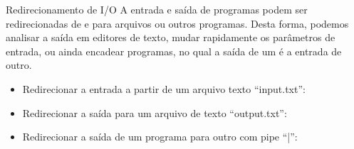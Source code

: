 \documentclass{beamer}
\begin{document}

\begin{frame}{Redirecionamento de I/O}
  A entrada e saída de programas podem ser redirecionadas de e para arquivos ou
  outros programas. Desta forma, podemos analisar a saída em editores de texto,
  mudar rapidamente os parâmetros de entrada, ou ainda encadear programas, no
  qual a saída de um é a entrada de outro.
  \begin{center}
    \begin{itemize}
    \item Redirecionar a entrada a partir de um arquivo texto ``input.txt'':
    \end{itemize}
    \begin{shell}
    \end{shell}

    \begin{itemize}
    \item Redirecionar a saída para um arquivo de texto ``output.txt'':
    \end{itemize}
    \begin{shell}
    \end{shell}

    \begin{itemize}
    \item Redirecionar a saída de um programa para outro com pipe ``|'':
    \end{itemize}
    \begin{shell}
    \end{shell}
    
  \end{center}

\end{frame}
\end{document}
